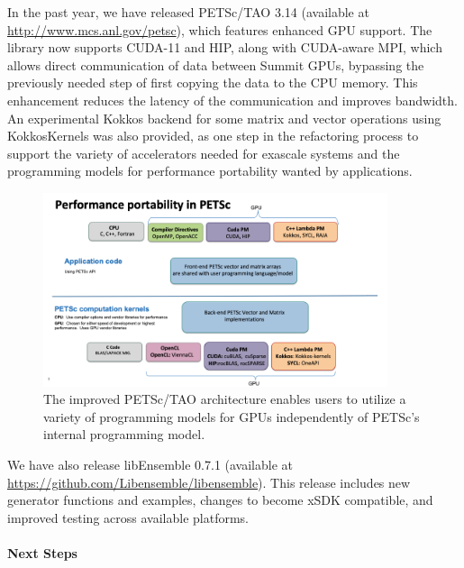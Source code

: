 In the past year, we have released PETSc/TAO 3.14 (available at \url{http://www.mcs.anl.gov/petsc}),
which features enhanced GPU support.  The library now supports CUDA-11 and HIP, along with CUDA-aware 
MPI, which allows direct communication of data between Summit GPUs, bypassing the previously needed 
step of first copying the data to the CPU memory. This enhancement reduces the latency of the 
communication and improves bandwidth.  An experimental Kokkos backend for some matrix and 
vector operations using KokkosKernels was also provided, as one step in the refactoring 
process to support the variety of accelerators needed for exascale systems and the 
programming models for performance portability wanted by applications.

\begin{figure}
\centering
\includegraphics[trim = 0in .2in 1.7in .2in, clip, width=0.9\textwidth]{projects/2.3.3-MathLibs/2.3.3.06-PETSc-TAO/petsc_arch}
\caption{The improved PETSc/TAO architecture enables users to utilize a variety of programming 
models for GPUs independently of PETSc's internal programming model.}
\label{fig:petsc-tao-fig}
\end{figure}

We have also release libEnsemble 0.7.1 (available at \url{https://github.com/Libensemble/libensemble}).
This release includes new generator functions and examples, changes to become xSDK compatible, and 
improved testing across available platforms.

\paragraph{Next Steps}

